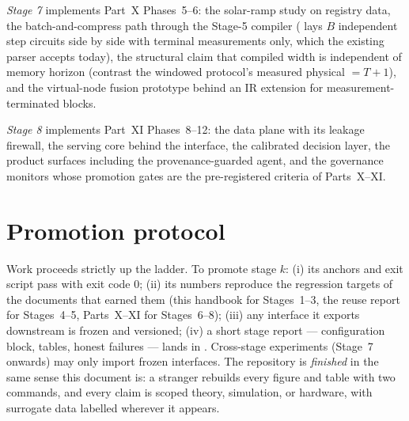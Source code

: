 \emph{Stage 7} implements Part~X Phases~5--6: the solar-ramp study on
registry data, the batch-and-compress path through the Stage-5 compiler
( lays $B$ independent step circuits side by side with
terminal measurements only, which the existing parser accepts today), the
structural claim that compiled width is independent of memory horizon
(contrast the windowed protocol's measured physical $=T{+}1$), and the
virtual-node fusion prototype behind an IR extension for
measurement-terminated blocks.

\emph{Stage 8} implements Part~XI Phases~8--12: the data plane with its
leakage firewall, the serving core behind the 
interface, the calibrated decision layer, the product surfaces including the
provenance-guarded agent, and the governance monitors whose promotion gates
are the pre-registered criteria of Parts~X--XI.

\section{Promotion protocol}
\label{sec:repo-promotion}

Work proceeds strictly up the ladder. To promote stage $k$: (i) its anchors
and exit script pass with exit code 0; (ii) its numbers reproduce the
regression targets of the documents that earned them (this handbook for
Stages~1--3, the reuse report for Stages~4--5, Parts~X--XI for Stages~6--8);
(iii) any interface it exports downstream is frozen and versioned; (iv) a
short stage report --- configuration block, tables, honest failures ---
lands in . Cross-stage experiments (Stage~7 onwards) may only
import frozen interfaces. The repository is \emph{finished} in the same sense
this document is: a stranger rebuilds every figure and table with two
commands, and every claim is scoped theory, simulation, or hardware, with
surrogate data labelled wherever it appears.
